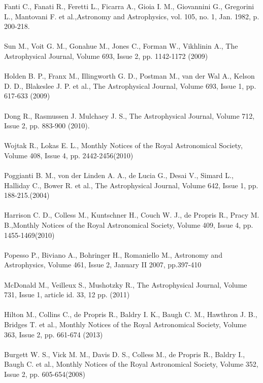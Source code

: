 Fanti C., Fanati R., Feretti L., Ficarra A., Gioia I. M., Giovannini G., Gregorini L., Mantovani F. et al.,Astronomy and Astrophysics, vol. 105, no. 1, Jan. 1982, p. 200-218.\\\\
Sun M., Voit G. M., Gonahue M., Jones C., Forman W., Vikhlinin A., The Astrophysical Journal, Volume 693, Issue 2, pp. 1142-1172 (2009)\\\\
Holden B. P., Franx M., Illingworth G. D., Postman M., van der Wal A., Kelson D. D., Blakeslee J. P. et al.,  The Astrophysical Journal, Volume 693, Issue 1, pp. 617-633 (2009)\\\\
Dong R., Rasmussen J. Mulchaey J. S., The Astrophysical Journal, Volume 712, Issue 2, pp. 883-900 (2010).\\\\
Wojtak R., Lokas E. L., Monthly Notices of the Royal Astronomical Society, Volume 408, Issue 4, pp. 2442-2456(2010)\\\\
Poggianti B. M., von der Linden A. A., de Lucia G., Desai V., Simard L., Halliday C., Bower R. et al., The Astrophysical Journal, Volume 642, Issue 1, pp. 188-215.(2004)\\\\
Harrison C. D., Colless M., Kuntschner H., Couch W. J., de Propris R., Pracy M. B.,Monthly Notices of the Royal Astronomical Society, Volume 409, Issue 4, pp. 1455-1469(2010)\\\\
Popesso P., Biviano A., Bohringer H., Romaniello M., Astronomy and Astrophysics, Volume 461, Issue 2, January II 2007, pp.397-410\\\\ 
McDonald M., Veilleux S., Mushotzky R., The Astrophysical Journal, Volume 731, Issue 1, article id. 33, 12 pp. (2011)\\\\
Hilton M., Collins C., de Propris R., Baldry I. K., Baugh C. M., Hawthron J. B., Bridges T. et al., Monthly Notices of the Royal Astronomical Society, Volume 363, Issue 2, pp. 661-674 (2013)\\\\
Burgett W. S., Vick M. M., Davis D. S., Colless M., de Propris R., Baldry I., Baugh C. et al., Monthly Notices of the Royal Astronomical Society, Volume 352, Issue 2, pp. 605-654(2008)\\\\
